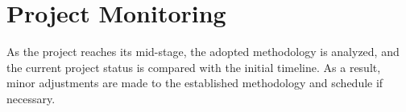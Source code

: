 \section{Project Monitoring}

As the project reaches its mid-stage, the adopted methodology is analyzed, and the current project status is compared with the initial timeline. As a result, minor adjustments are made to the established methodology and schedule if necessary.



